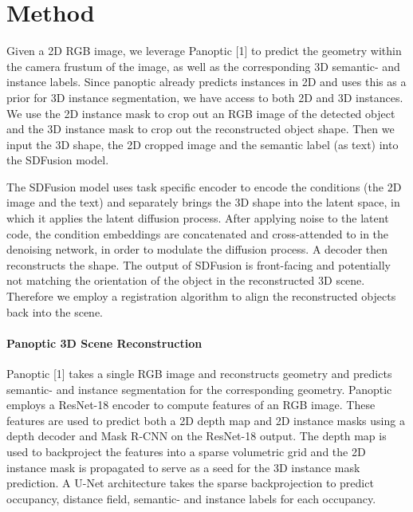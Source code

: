 \section{Method}
\label{sec:method}

Given a 2D RGB image, we leverage Panoptic [1] to predict the geometry within the camera frustum of the image, as well as the corresponding 3D semantic- and instance labels.
Since panoptic already predicts instances in 2D and uses this as a prior for 3D instance segmentation, we have access to both 2D and 3D instances.
We use the 2D instance mask to crop out an RGB image of the detected object and the 3D instance mask to crop out the reconstructed object shape.
Then we input the 3D shape, the 2D cropped image and the semantic label (as text) into the SDFusion model.

The SDFusion model uses task specific encoder to encode the conditions (the 2D image and the text) and separately brings the 3D shape into the latent space, in which it applies the latent diffusion process.
After applying noise to the latent code, the condition embeddings are concatenated and cross-attended to in the denoising network, in order to modulate the diffusion process.
A decoder then reconstructs the shape. The output of SDFusion is front-facing and potentially not matching the orientation of the object in the reconstructed 3D scene.
Therefore we employ a registration algorithm to align the reconstructed objects back into the scene.

\paragraph{ Panoptic 3D Scene Reconstruction}
Panoptic [1] takes a single RGB image and reconstructs geometry and predicts semantic- and instance segmentation for the corresponding geometry.
Panoptic employs a ResNet-18 encoder to compute features of an RGB image.
These features are used to predict both a 2D depth map and 2D instance masks using a depth decoder and Mask R-CNN on the ResNet-18 output.
The depth map is used to backproject the features into a sparse volumetric grid and the 2D instance mask is propagated to serve as a seed for the 3D instance mask prediction.
A U-Net architecture takes the sparse backprojection to predict occupancy, distance field, semantic- and instance labels for each occupancy.

